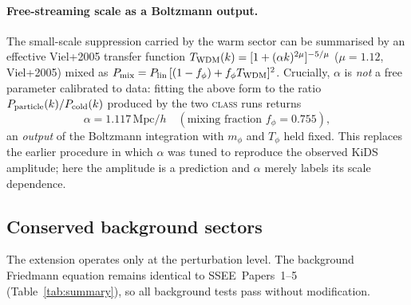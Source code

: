 \documentclass[12pt,a4paper]{article}
\newcommand{\SSEE}{\textsc{SSEE}}
\begin{document}
\paragraph{Free-streaming scale as a Boltzmann output.}
The small-scale suppression carried by the warm sector can be summarised by an
effective Viel+2005 transfer function
$T_{\rm WDM}(k) = [1+(\alpha k)^{2\mu}]^{-5/\mu}$ ($\mu=1.12$, Viel+2005)
mixed as $P_{\rm mix} = P_{\rm lin}\,[(1-f_\phi) + f_\phi T_{\rm WDM}]^2$. Crucially,
$\alpha$ is \emph{not} a free parameter calibrated to data: fitting the above form to
the ratio $P_{\rm particle}(k)/P_{\rm cold}(k)$ produced by the two \textsc{class}
runs returns
\begin{equation}
  \alpha = 1.117\,\mathrm{Mpc}/h \quad (\text{mixing fraction } f_\phi = 0.755),
  \label{eq:alpha_output}
\end{equation}
an \emph{output} of the Boltzmann integration with $m_\phi$ and $T_\phi$ held fixed.
This replaces the earlier procedure in which $\alpha$ was tuned to reproduce the
observed KiDS amplitude; here the amplitude is a prediction and $\alpha$ merely labels
its scale dependence.

\subsection{Conserved background sectors}
\label{subsec:unchanged}

The extension operates only at the perturbation level. The background Friedmann
equation remains identical to \SSEE\ Papers~1--5 (Table~\ref{tab:summary}),
so all background tests pass without modification.
\end{document}
